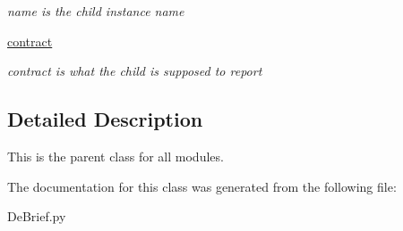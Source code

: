 \begin{DoxyCompactItemize}
\begin{DoxyCompactList}\small\item\em name is the child instance name \end{DoxyCompactList}\item 
\hypertarget{classc_1_1_de_brief_1_1_de_brief___module_a3c9326a875e28efd0c2a561261225b41}{}\hyperlink{classc_1_1_de_brief_1_1_de_brief___module_a3c9326a875e28efd0c2a561261225b41}{contract}\label{classc_1_1_de_brief_1_1_de_brief___module_a3c9326a875e28efd0c2a561261225b41}

\begin{DoxyCompactList}\small\item\em contract is what the child is supposed to report \end{DoxyCompactList}\end{DoxyCompactItemize}


\subsection{Detailed Description}
This is the parent class for all modules. 



The documentation for this class was generated from the following file\+:\begin{DoxyCompactItemize}
\item 
De\+Brief.\+py\end{DoxyCompactItemize}

